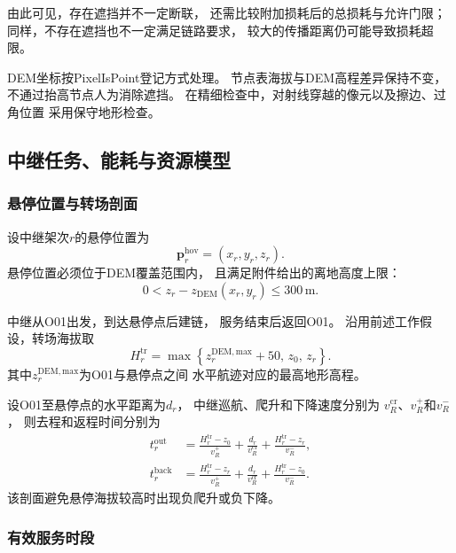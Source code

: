 \documentclass[bwprint]{gmcmthesis}
\begin{document}
由此可见，存在遮挡并不一定断联，
还需比较附加损耗后的总损耗与允许门限；
同样，不存在遮挡也不一定满足链路要求，
较大的传播距离仍可能导致损耗超限。

DEM坐标按PixelIsPoint登记方式处理。
节点表海拔与DEM高程差异保持不变，
不通过抬高节点人为消除遮挡。
在精细检查中，对射线穿越的像元以及擦边、过角位置
采用保守地形检查。

\subsection{中继任务、能耗与资源模型}

\subsubsection{悬停位置与转场剖面}

设中继架次$r$的悬停位置为
\begin{equation}
    \boldsymbol{p}_r^{\mathrm{hov}}
    =
    (x_r,y_r,z_r).
\end{equation}
悬停位置必须位于DEM覆盖范围内，
且满足附件给出的离地高度上限：
\begin{equation}
    0<
    z_r-z_{\mathrm{DEM}}(x_r,y_r)
    \leq300\,\mathrm{m}.
\end{equation}

中继从O01出发，到达悬停点后建链，
服务结束后返回O01。
沿用前述工作假设，转场海拔取
\begin{equation}
    H_r^{\mathrm{tr}}
    =
    \max\left\{
    z_r^{\mathrm{DEM,max}}+50,\,
    z_0,\,
    z_r
    \right\}.
\end{equation}
其中$z_r^{\mathrm{DEM,max}}$为O01与悬停点之间
水平航迹对应的最高地形高程。

设O01至悬停点的水平距离为$d_r$，
中继巡航、爬升和下降速度分别为
$v_R^{\mathrm{cr}}$、$v_R^{+}$和$v_R^{-}$，
则去程和返程时间分别为
\begin{align}
    t_r^{\mathrm{out}}
    &=
    \frac{H_r^{\mathrm{tr}}-z_0}{v_R^{+}}
    +\frac{d_r}{v_R^{\mathrm{cr}}}
    +\frac{H_r^{\mathrm{tr}}-z_r}{v_R^{-}},\\
    t_r^{\mathrm{back}}
    &=
    \frac{H_r^{\mathrm{tr}}-z_r}{v_R^{+}}
    +\frac{d_r}{v_R^{\mathrm{cr}}}
    +\frac{H_r^{\mathrm{tr}}-z_0}{v_R^{-}}.
\end{align}
该剖面避免悬停海拔较高时出现负爬升或负下降。

\subsubsection{有效服务时段}
\end{document}
